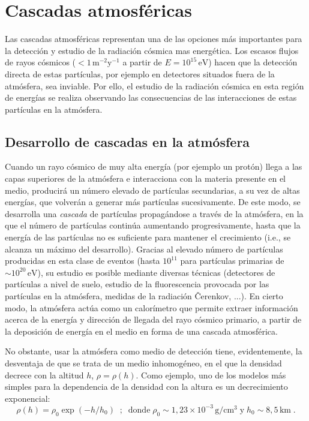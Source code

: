 \documentclass[12 pt, a4paper]{article} %
\numberwithin{equation}{section}
\numberwithin{figure}{section}
\numberwithin{table}{section}
\begin{document}
	\section{Cascadas atmosféricas}\label{sec2}
%	
%	

Las cascadas atmosféricas representan una de las opciones más importantes para la detección y estudio de la radiación cósmica mas energética. Los escasos flujos de rayos cósmicos ($<1\,\mathrm{m^{-2}y^{-1}}$ a partir de $E=10^{15}\,\mathrm{eV}$) hacen que la detección directa de estas partículas, por ejemplo en detectores situados fuera de la atmósfera, sea inviable. Por ello, el estudio de la radiación cósmica en esta región de energías se realiza observando las consecuencias de las interacciones de estas partículas en la atmósfera. 


\subsection{Desarrollo de cascadas en la atmósfera}\label{sec21}

Cuando un rayo cósmico de muy alta energía (por ejemplo un protón) llega a las capas superiores de la atmósfera e interacciona con la materia presente en el medio, producirá un número elevado de partículas secundarias, a su vez de altas energías, que volverán a generar más partículas sucesivamente. De este modo, se desarrolla una \textit{cascada} de partículas propagándose a través de la atmósfera, en la que el número de partículas continúa aumentando progresivamente, hasta que la energía de las partículas no es suficiente para mantener el crecimiento (i.e., se alcanza un máximo del desarrollo). Gracias al elevado número de partículas producidas en esta clase de eventos (hasta $10^{11}$ para partículas primarias de $\sim 10^{20}\,\mathrm{eV}$), su estudio es posible mediante diversas técnicas (detectores de partículas a nivel de suelo, estudio de la fluorescencia provocada por las partículas en la atmósfera, medidas de la radiación \v{C}erenkov, ...). En cierto modo, la atmósfera actúa como un calorímetro que permite extraer información acerca de la energía y dirección de llegada del rayo cósmico primario, a partir de la deposición de energía en el medio en forma de una cascada atmosférica.

No obstante, usar la atmósfera como medio de detección tiene, evidentemente, la desventaja de que se trata de un medio inhomogéneo, en el que la densidad decrece con la altitud $h$, $\rho = \rho(h)$. Como ejemplo, uno de los modelos más simples para la dependencia de la densidad con la altura es un decrecimiento exponencial:
\begin{equation}
	\rho(h)=\rho_0\exp\left(-h/h_0\right)\; \;;\;\;\text{donde}\;\rho_0\sim1,23\times 10^{-3}\,\mathrm{g/cm^3}\;\text{y}\;h_0\sim8,5\,\mathrm{km}\;.\label{ec21}
\end{equation}
\end{document}
